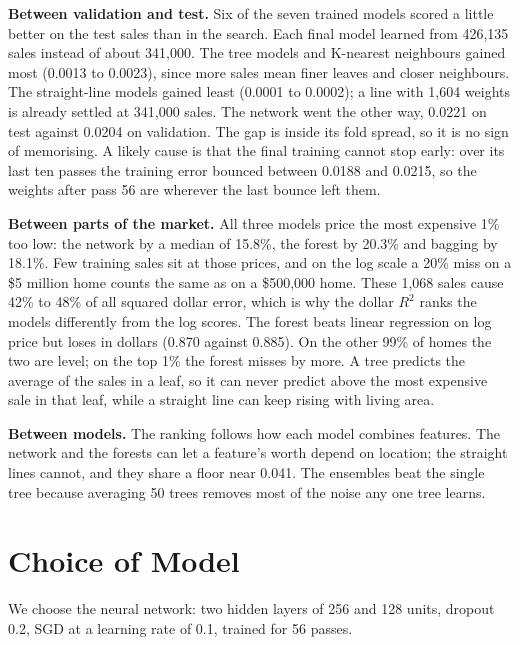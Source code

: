 \documentclass[sigconf,nonacm,10pt]{acmart}
\begin{document}
\textbf{Between validation and test.} Six of the seven trained models scored a little better on the test sales than in the search. Each final model learned from 426,135 sales instead of about 341,000. The tree models and K-nearest neighbours gained most (0.0013 to 0.0023), since more sales mean finer leaves and closer neighbours. The straight-line models gained least (0.0001 to 0.0002); a line with 1,604 weights is already settled at 341,000 sales. The network went the other way, 0.0221 on test against 0.0204 on validation. The gap is inside its fold spread, so it is no sign of memorising. A likely cause is that the final training cannot stop early: over its last ten passes the training error bounced between 0.0188 and 0.0215, so the weights after pass 56 are wherever the last bounce left them.

\textbf{Between parts of the market.} All three models price the most expensive 1\% too low: the network by a median of 15.8\%, the forest by 20.3\% and bagging by 18.1\%. Few training sales sit at those prices, and on the log scale a 20\% miss on a \$5 million home counts the same as on a \$500,000 home. These 1,068 sales cause 42\% to 48\% of all squared dollar error, which is why the dollar $R^2$ ranks the models differently from the log scores. The forest beats linear regression on log price but loses in dollars (0.870 against 0.885). On the other 99\% of homes the two are level; on the top 1\% the forest misses by more. A tree predicts the average of the sales in a leaf, so it can never predict above the most expensive sale in that leaf, while a straight line can keep rising with living area.

\textbf{Between models.} The ranking follows how each model combines features. The network and the forests can let a feature's worth depend on location; the straight lines cannot, and they share a floor near 0.041. The ensembles beat the single tree because averaging 50 trees removes most of the noise any one tree learns.

\section{Choice of Model}
\label{sec:choice}

We choose the neural network: two hidden layers of 256 and 128 units, dropout 0.2, SGD at a learning rate of 0.1, trained for 56 passes.
\end{document}
